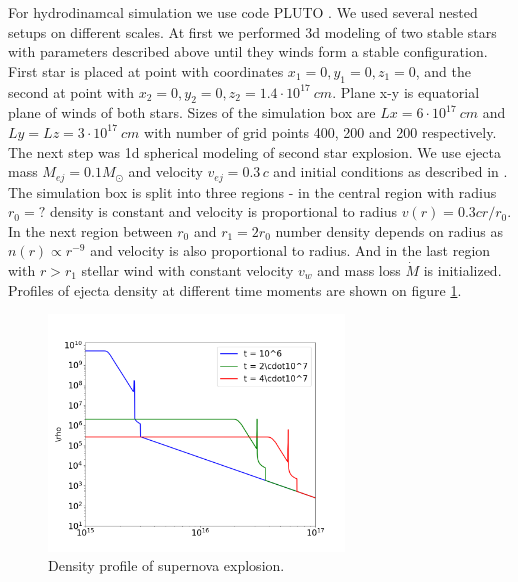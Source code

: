 \documentclass{article}
\begin{document}
	For hydrodinamcal simulation we use code PLUTO \cite{MignonePluto}. We used several nested setups on different scales. At first we performed 3d modeling of two stable stars with parameters described above until they winds form a stable configuration. First star is placed at point with coordinates $x_1 = 0, y_1 = 0, z_1 = 0$, and the second at point with $x_2 = 0, y_2 = 0, z_2 = 1.4\cdot10^{17}~cm$. Plane x-y is equatorial plane of winds of both stars. Sizes of the simulation box are $Lx = 6\cdot 10^{17}~cm$ and $Ly = Lz = 3\cdot 10^{17}~cm$ with number of grid points 400, 200 and 200 respectively. The next step was 1d spherical modeling of second star explosion. We use ejecta mass $M_{ej} = 0.1 M_\odot$ and velocity $v_{ej} = 0.3\,c$ and initial conditions as described in \cite{ChevalierLiang1989, Petruk2021snr}. The simulation box is split into three regions - in the central region with radius $r_0 = ?$ density is constant and velocity is proportional to radius $v(r) = 0.3 c r/r_0$. In the next region between $r_0$ and $r_1 = 2 r_0$ number density depends on radius as $n(r) \propto r^{-9}$ and velocity is also proportional to radius. And in the last region with $r > r_1$ stellar wind with constant velocity $v_w$ and mass loss $\dot{M}$ is initialized. Profiles of ejecta density at different time moments are shown on figure \ref{snr}.
	\begin{figure}
		\centering
		\includegraphics[width=0.7\textwidth]{./fig/snr.png} 
		\caption{Density profile of supernova explosion.}
		\label{snr}
	\end{figure}
	
\end{document}
